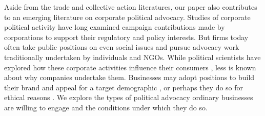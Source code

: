 \documentclass{article}
\begin{document}
Aside from the trade and collective action literatures, our paper also contributes to an emerging literature on corporate political advocacy. Studies of corporate political activity have long examined campaign contributions made by corporations to support their regulatory and policy interests. But firms today often take public positions on even social issues and pursue advocacy work traditionally undertaken by individuals and NGOs. While political scientists have explored how these corporate activities influence their consumers \citep{endres2017boycotts,panagopoulos2020partisan}, less is known about why companies undertake them. Businesses may adopt positions to build their brand and appeal for a target demographic \citep{hydock2020should}, or perhaps they do so for ethical reasons \citep{wettstein2016should}. We explore the types of political advocacy ordinary businesses are willing to engage and the conditions under which they do so.



\end{document}
